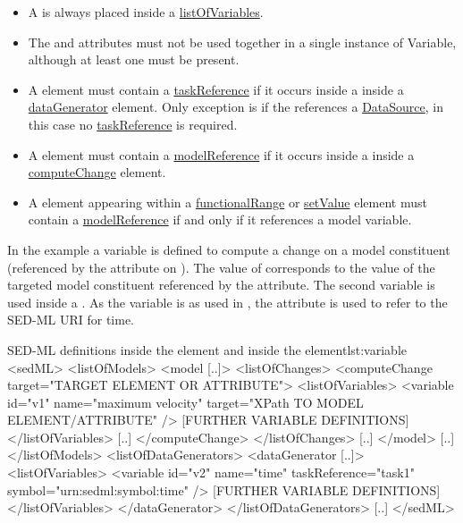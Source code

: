 \begin{itemize}
	\item A  is always placed inside a \hyperref[sec:listOfVariables]{listOfVariables}. 
	\item The \hyperref[sec:symbol]{} and \hyperref[sec:target]{} attributes must not be used together in a single instance of Variable, although at least one must be present.
	\item A  element must contain a \hyperref[sec:taskReference]{taskReference} if it occurs inside a \hyperref[sec:listOfVariables]{} inside a \hyperref[class:dataGenerator]{dataGenerator} element. Only exception is if the  references a \hyperref[class:dataSource]{DataSource}, in this case no \hyperref[sec:taskReference]{taskReference} is required.
	\item A  element must contain a \hyperref[sec:modelReference]{modelReference} if it occurs inside a \hyperref[sec:listOfVariables]{} inside a \hyperref[class:computeChange]{computeChange} element.
	\item A  element appearing within a \hyperref[class:functionalRange]{functionalRange} or \hyperref[class:setValue]{setValue} element must contain a \hyperref[sec:modelReference]{modelReference} if and only if it references a model variable.
\end{itemize}

In the example a variable  is defined to compute a change on a model constituent (referenced by the \hyperref[sec:target]{} attribute on \hyperref[class:computeChange]{}). The value of  corresponds to the value of the targeted model constituent referenced by the  attribute. The second variable  is used inside a \hyperref[class:dataGenerator]{}. As the variable is  as used in , the \hyperref[sec:symbol]{} attribute is used to refer to the SED-ML URI for time.

\begin{myXmlLst}{SED-ML  definitions inside the  element and inside the  element}{lst:variable}
<sedML>
	<listOfModels>
		<model [..]>
			<listOfChanges>
				<computeChange target="TARGET ELEMENT OR ATTRIBUTE">
				<listOfVariables>
				   <variable id="v1" name="maximum velocity" target="XPath TO MODEL ELEMENT/ATTRIBUTE" />
				   [FURTHER VARIABLE DEFINITIONS]
				</listOfVariables>
				[..]
				</computeChange>
			</listOfChanges>
			[..]
		</model>
		[..]
	</listOfModels>
	<listOfDataGenerators>
		<dataGenerator [..]>
			<listOfVariables>
				<variable id="v2" name="time" taskReference="task1" symbol="urn:sedml:symbol:time" />
				[FURTHER VARIABLE DEFINITIONS]
			</listOfVariables>
		</dataGenerator>
	</listOfDataGenerators>
	[..]
</sedML>
\end{myXmlLst}


